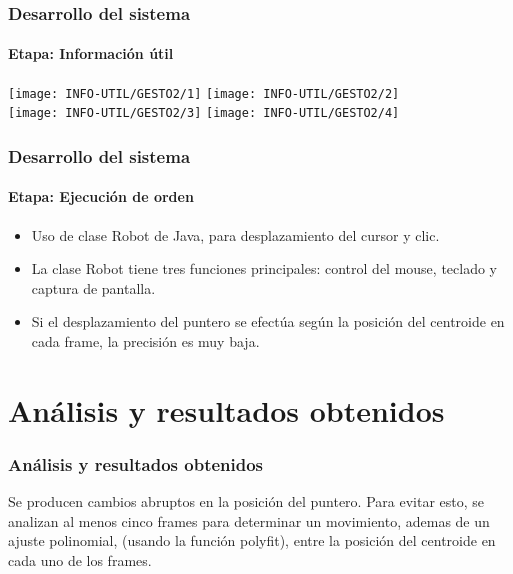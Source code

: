 \documentclass[xcolor=dvipsnames]{beamer}
\begin{document}
	\begin{frame}
		\transdissolve
		\frametitle{Desarrollo del sistema}
		\framesubtitle{Etapa: Información útil}
		\begin{center}
			\texttt{[image: INFO-UTIL/GESTO2/1]} \hspace{.5cm}
			\texttt{[image: INFO-UTIL/GESTO2/2]}\\
			\vspace{.5cm}
			\texttt{[image: INFO-UTIL/GESTO2/3]} \hspace{.5cm}
			\texttt{[image: INFO-UTIL/GESTO2/4]}
		\end{center}
	\end{frame}

	\begin{frame}
		\transdissolve
		\frametitle{Desarrollo del sistema}
		\framesubtitle{Etapa: Ejecución de orden}
		\begin{itemize}
		\item Uso de clase Robot de Java, para desplazamiento del cursor y clic.
		\item La clase Robot tiene tres funciones principales: control del mouse, teclado y captura de pantalla.
		\item Si el desplazamiento del puntero se efectúa según la posición del centroide en cada frame, la precisión es muy baja.
		\end{itemize}
	\end{frame}


	\section{Análisis y resultados obtenidos}
	\begin{frame}
		\transdissolve
		\frametitle{Análisis y resultados obtenidos}
	    Se producen cambios abruptos en la posición del puntero. Para evitar esto, se analizan al menos cinco frames para determinar un movimiento, ademas de un ajuste polinomial, (usando la función polyfit), entre la posición del centroide en cada uno de los frames.
	\end{frame}


\end{document}
